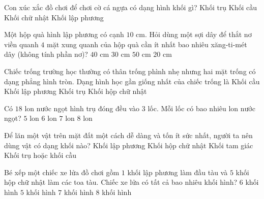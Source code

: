 \begin{ex} %
Con xúc xắc đồ chơi để chơi cờ cá ngựa có dạng hình khối gì?
\choice
{Khối trụ}
{Khối cầu}
{Khối chữ nhật}
{\True Khối lập phương}
\end{ex}

\begin{ex} %
Một hộp quà hình lập phương có cạnh $10\text{ cm}$. Hỏi dùng một sợi dây để thắt nơ viền quanh $4$ mặt xung quanh của hộp quà cần ít nhất bao nhiêu xăng-ti-mét dây (không tính phần nơ)?
\choice
{\True $40\text{ cm}$}
{$30\text{ cm}$}
{$50\text{ cm}$}
{$20\text{ cm}$}
\end{ex}

\begin{ex} %
Chiếc trống trường học thường có thân trống phình nhẹ nhưng hai mặt trống có dạng phẳng hình tròn. Dạng hình học gần giống nhất của chiếc trống là
\choice
{Khối cầu}
{Khối lập phương}
{\True Khối trụ}
{Khối hộp chữ nhật}
\end{ex}

\begin{ex} %
Có $18$ lon nước ngọt hình trụ đóng đều vào $3$ lốc. Mỗi lốc có bao nhiêu lon nước ngọt?
\choice
{$5$ lon}
{\True $6$ lon}
{$7$ lon}
{$8$ lon}
\end{ex}

\begin{ex} %
Để lăn một vật trên mặt đất một cách dễ dàng và tốn ít sức nhất, người ta nên dùng vật có dạng khối nào?
\choice
{Khối lập phương}
{Khối hộp chữ nhật}
{Khối tam giác}
{\True Khối trụ hoặc khối cầu}
\end{ex}

\begin{ex} %
Bé xếp một chiếc xe lửa đồ chơi gồm $1$ khối lập phương làm đầu tàu và $5$ khối hộp chữ nhật làm các toa tàu. Chiếc xe lửa có tất cả bao nhiêu khối hình?
\choice
{\True $6$ khối hình}
{$5$ khối hình}
{$7$ khối hình}
{$8$ khối hình}
\end{ex}

